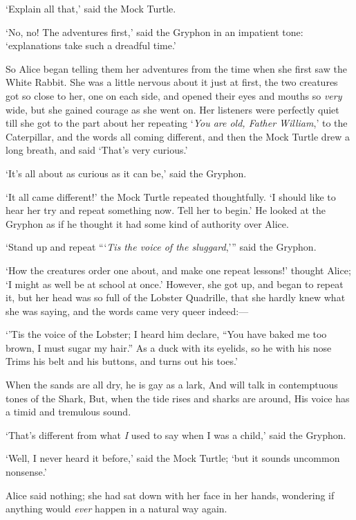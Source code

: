 \documentclass[12pt,openany]{memoir}
\renewenvironment{quote}%
  {\list{}{\leftmargin=2\parindent\rightmargin=0in}\item[]}%
  {\endlist}
\begin{document}
`Explain all that,' said the Mock Turtle.

`No, no! The adventures first,' said the Gryphon in an impatient tone: `explanations take such a dreadful time.'

So Alice began telling them her adventures from the time when she first saw the White Rabbit. She was a little nervous about it just at first, the two creatures got so close to her, one on each side, and opened their eyes and mouths so \textit{very} wide, but she gained courage as she went on. Her listeners were perfectly quiet till she got to the part about her repeating `\textit{You are old, Father William},' to the Caterpillar, and the words all coming different, and then the Mock Turtle drew a long breath, and said `That's very curious.'

`It's all about as curious as it can be,' said the Gryphon.

`It all came different!' the Mock Turtle repeated thoughtfully. `I should like to hear her try and repeat something now. Tell her to begin.' He looked at the Gryphon as if he thought it had some kind of authority over Alice.

`Stand up and repeat ```\textit{Tis the voice of the sluggard},''' said the Gryphon.

`How the creatures order one about, and make one repeat les\-sons!' thought Alice; `I might as well be at school at once.' However, she got up, and began to repeat it, but her head was so full of the Lobster Quadrille, that she hardly knew what she was saying, and the words came very queer indeed:---

\begin{quote}
`'Tis the voice of the Lobster; I heard him declare,
``You have baked me too brown, I must sugar my hair.''
 As a duck with its eyelids, so he with his nose
Trims his belt and his buttons, and turns out his toes.'

When the sands are all dry, he is gay as a lark,
And will talk in contemptuous tones of the Shark,
But, when the tide rises and sharks are around,
His voice has a timid and tremulous sound.
\end{quote}

`That's different from what \textit{I} used to say when I was a child,' said the Gryphon.

`Well, I never heard it before,' said the Mock Turtle; `but it sounds uncommon nonsense.'

Alice said nothing; she had sat down with her face in her hands, wondering if anything would \textit{ever} happen in a natural way again.
\end{document}
